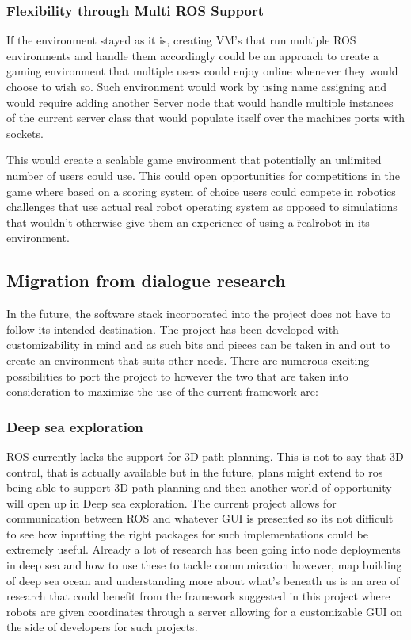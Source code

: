     \subsubsection{Flexibility through Multi ROS Support}
      If the environment stayed as it is, creating VM's that run multiple ROS environments and handle them accordingly could be an approach to create a gaming environment that multiple users could enjoy online whenever they would choose to wish so. Such environment would work by using name assigning and would require adding another Server node that would handle multiple instances of the current server class that would populate itself over the machines ports with sockets. 

      This would create a scalable game environment that potentially an unlimited number of users could use. This could open opportunities for competitions in the game where based on a scoring system of choice users could compete in robotics challenges that use actual real robot operating system as opposed to simulations that wouldn't otherwise give them an experience of using a \"real\" robot in its environment.

    \subsection{Migration from dialogue research}
      In the future, the software stack incorporated into the project does not have to follow its intended destination. The project has been developed with customizability in mind and as such bits and pieces can be taken in and out to create an environment that suits other needs. There are numerous exciting possibilities to port the project to however the two that are taken into consideration to maximize the use of the current framework are:

      \subsubsection{Deep sea exploration}
        ROS currently lacks the support for 3D path planning. This is not to say that 3D control, that is actually available but in the future, plans might extend to ros being able to support 3D path planning and then another world of opportunity will open up in Deep sea exploration. The current project allows for communication between ROS and whatever GUI is presented so its not difficult to see how inputting the right packages for such implementations could be extremely useful. Already a lot of research has been going into node deployments in deep sea and how to use these to tackle communication however, map building of deep sea ocean and understanding more about what's beneath us is an area of research that could benefit from the framework suggested in this project where robots are given coordinates through a server allowing for a customizable GUI on the side of developers for such projects.

